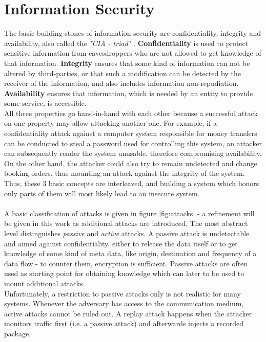 \section{Information Security}

The basic building stones of information security are confidentiality, integrity and availability, also called the \textit{"CIA - triad"} \cite{stallings}.
\textbf{Confidentiality} is used to protect sensitive information from eavesdroppers who are not allowed to get knowledge of that information. 
\textbf{Integrity} ensures that some kind of information can not be altered by third-parties, or that such a modification can be detected by the
receiver of the information, and also includes information non-repudiation.
\textbf{Availability} ensures that information, which is needed by an entity to provide some service, is accessible.
\\
All three properties go hand-in-hand with each other because a successful attack on one property may allow attacking another one. For example, if a
confidentiality attack against a computer system responsible for money transfers can be conducted to steal a password used for controlling this system,
an attacker
can subsequently render the system unusable, therefore compromising availability. On the other hand, the attacker could also try to remain undetected and change
booking orders, thus mounting an attack against the integrity of the system. Thus, these 3 basic concepts are interleaved, and building a system which honors
only parts of them will most likely lead to an insecure system.
\\
\\
A basic classification of attacks is given in figure \ref{fig:attacks} - a refinement will be given in this work as additional attacks are introduced.
The most abstract level distinguishes \textit{passive} and \textit{active} attacks. A passive
attack is undetectable and aimed against confidentiality, either to release the data itself or to get knowledge of some kind of meta data, like origin,
destination and frequency of a data flow - to counter them, encryption is sufficient. Passive attacks are often used as starting point for obtaining knowledge which can later to be used to mount 
additional attacks.
\\
Unfortunately, a restriction to passive attacks only is not realistic for many systems. Whenever the adversary has access to the communication medium, active attacks
cannot be ruled out. A replay attack happens when the attacker monitors traffic first (i.e. a passive attack) and afterwards injects a recorded package, 
